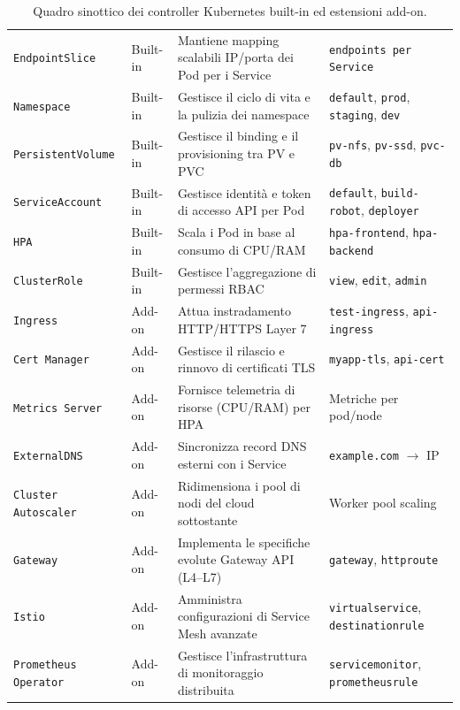\documentclass[11pt, a4paper]{article}
\begin{document}
\begin{table}[H]
\begin{tabularx}{\textwidth}{l p{2.2cm} X p{3.8cm}}
\texttt{EndpointSlice} & Built-in & Mantiene mapping scalabili IP/porta dei Pod per i Service & \texttt{endpoints per Service} \\
\texttt{Namespace} & Built-in & Gestisce il ciclo di vita e la pulizia dei namespace & \texttt{default}, \texttt{prod}, \texttt{staging}, \texttt{dev} \\
\texttt{PersistentVolume} & Built-in & Gestisce il binding e il provisioning tra PV e PVC & \texttt{pv-nfs}, \texttt{pv-ssd}, \texttt{pvc-db} \\
\texttt{ServiceAccount} & Built-in & Gestisce identità e token di accesso API per Pod & \texttt{default}, \texttt{build-robot}, \texttt{deployer} \\
\texttt{HPA} & Built-in & Scala i Pod in base al consumo di CPU/RAM & \texttt{hpa-frontend}, \texttt{hpa-backend} \\
\texttt{ClusterRole} & Built-in & Gestisce l'aggregazione di permessi RBAC & \texttt{view}, \texttt{edit}, \texttt{admin} \\
\midrule
\texttt{Ingress} & Add-on & Attua instradamento HTTP/HTTPS Layer 7 & \texttt{test-ingress}, \texttt{api-ingress} \\
\texttt{Cert Manager} & Add-on & Gestisce il rilascio e rinnovo di certificati TLS & \texttt{myapp-tls}, \texttt{api-cert} \\
\texttt{Metrics Server} & Add-on & Fornisce telemetria di risorse (CPU/RAM) per HPA & Metriche per pod/node \\
\texttt{ExternalDNS} & Add-on & Sincronizza record DNS esterni con i Service & \texttt{example.com} $\rightarrow$ IP \\
\texttt{Cluster Autoscaler} & Add-on & Ridimensiona i pool di nodi del cloud sottostante & Worker pool scaling \\
\texttt{Gateway} & Add-on & Implementa le specifiche evolute Gateway API (L4--L7) & \texttt{gateway}, \texttt{httproute} \\
\texttt{Istio} & Add-on & Amministra configurazioni di Service Mesh avanzate & \texttt{virtualservice}, \texttt{destinationrule} \\
\texttt{Prometheus Operator}& Add-on & Gestisce l'infrastruttura di monitoraggio distribuita & \texttt{servicemonitor}, \texttt{prometheusrule} \\
\bottomrule
\end{tabularx}
\caption{Quadro sinottico dei controller Kubernetes built-in ed estensioni add-on.}
\label{tab:controllers}
\end{table}
\end{document}
